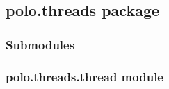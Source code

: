 \documentclass[letterpaper,10pt,english]{sphinxmanual}
\begin{document}
\subsection{polo.threads package}
\label{\detokenize{polo.threads:polo-threads-package}}\label{\detokenize{polo.threads::doc}}

\subsubsection{Submodules}
\label{\detokenize{polo.threads:submodules}}

\subsubsection{polo.threads.thread module}
\label{\detokenize{polo.threads:module-polo.threads.thread}}\label{\detokenize{polo.threads:polo-threads-thread-module}}
\end{document}
